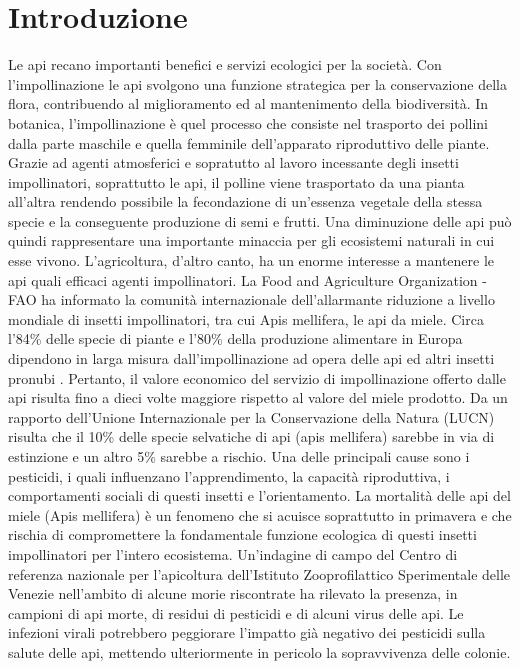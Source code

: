 \chapter{Introduzione}
Le api recano importanti benefici e servizi ecologici per la società. Con l’impollinazione le api svolgono una funzione strategica per la conservazione della flora, contribuendo al miglioramento ed al mantenimento della biodiversità.\newline 
In botanica, l’impollinazione è quel processo che consiste nel trasporto dei pollini dalla parte maschile e quella femminile dell’apparato riproduttivo delle piante. Grazie ad agenti atmosferici e sopratutto al lavoro incessante degli insetti impollinatori, soprattutto le api, il polline viene trasportato da una pianta all’altra rendendo possibile la fecondazione di un’essenza vegetale della stessa specie e la conseguente produzione di semi e frutti. Una diminuzione delle api può quindi rappresentare una importante minaccia per gli ecosistemi naturali in cui esse vivono. L’agricoltura, d’altro canto, ha un enorme interesse a mantenere le api quali efficaci agenti impollinatori. La Food and Agriculture Organization - FAO ha informato la comunità internazionale dell’allarmante riduzione a livello mondiale di insetti impollinatori, tra cui Apis mellifera, le api da miele. Circa l’84\% delle specie di piante e l’80\% della produzione alimentare in Europa dipendono in larga misura dall’impollinazione ad opera delle api ed altri insetti pronubi \cite{bellucciapi}. Pertanto, il valore economico del servizio di impollinazione offerto dalle api risulta fino a dieci volte maggiore rispetto al valore del miele prodotto.\newline 
Da un rapporto dell’Unione Internazionale per la Conservazione della Natura (LUCN) risulta che il 10\% delle specie selvatiche di api (apis mellifera) sarebbe in via di estinzione e un altro 5\% sarebbe a rischio. Una delle principali cause sono i pesticidi, i quali influenzano l’apprendimento, la capacità riproduttiva, i comportamenti sociali di questi insetti e l'orientamento. \newline
La mortalità delle api del miele (Apis mellifera) è un fenomeno che si acuisce soprattutto in primavera e che rischia di compromettere la fondamentale funzione ecologica di questi insetti impollinatori per l’intero ecosistema.\newline
Un’indagine di campo del Centro di referenza nazionale per l’apicoltura dell’Istituto Zooprofilattico Sperimentale delle Venezie nell’ambito di alcune morie riscontrate ha rilevato la presenza, in campioni di api morte, di residui di pesticidi e di alcuni virus delle api. Le infezioni virali potrebbero peggiorare l’impatto già negativo dei pesticidi sulla salute delle api, mettendo ulteriormente in pericolo la sopravvivenza delle colonie.\newline
